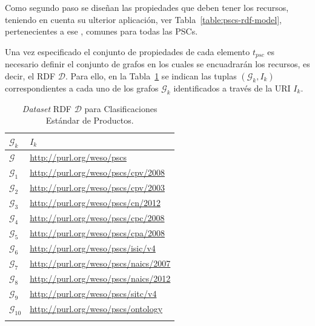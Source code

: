 Como segundo paso se diseñan las propiedades que deben tener los recursos, teniendo en cuenta su ulterior aplicación, 
ver Tabla~\ref{table:pscs-rdf-model}, pertenecientes a ese \dataset, comunes para todas las \gls{PSC}s.

Una vez especificado el conjunto de propiedades de cada elemento $t_{psc}$ es necesario definir el conjunto 
de grafos en los cuales se encuadrarán los recursos, es decir, el \dataset \gls{RDF} $\mathcal{D}$. Para ello, 
en la Tabla~\ref{table:pscs-dataset} se indican las tuplas $(\mathcal{G}_k, I_k)$ correspondientes a cada uno 
de los grafos $\mathcal{G}_k$ identificados a través de la URI $I_k$.

\begin{longtable}[c]{|p{3cm}|p{9cm}|} 
\hline
  \textbf{$\mathcal{G}_k$} &  \textbf{$I_k$}  \\\hline
\endhead
 \textbf{$\mathcal{G}$}   & \url{http://purl.org/weso/pscs} \\ \hline
 \textbf{$\mathcal{G}_1$} & \url{http://purl.org/weso/pscs/cpv/2008} \\ \hline
 \textbf{$\mathcal{G}_2$} & \url{http://purl.org/weso/pscs/cpv/2003} \\ \hline
 \textbf{$\mathcal{G}_3$} & \url{http://purl.org/weso/pscs/cn/2012} \\ \hline
 \textbf{$\mathcal{G}_4$} & \url{http://purl.org/weso/pscs/cpc/2008} \\ \hline
 \textbf{$\mathcal{G}_5$} & \url{http://purl.org/weso/pscs/cpa/2008} \\ \hline
 \textbf{$\mathcal{G}_6$} & \url{http://purl.org/weso/pscs/isic/v4} \\ \hline
 \textbf{$\mathcal{G}_7$} & \url{http://purl.org/weso/pscs/naics/2007} \\ \hline
 \textbf{$\mathcal{G}_8$} & \url{http://purl.org/weso/pscs/naics/2012} \\ \hline
 \textbf{$\mathcal{G}_9$} & \url{http://purl.org/weso/pscs/sitc/v4} \\ \hline
 \textbf{$\mathcal{G}_{10}$} & \url{http://purl.org/weso/pscs/ontology} \\ \hline 
\hline
\caption{\textit{Dataset} RDF $\mathcal{D}$ para Clasificaciones Estándar de Productos.}\label{table:pscs-dataset}\\    
\end{longtable}


